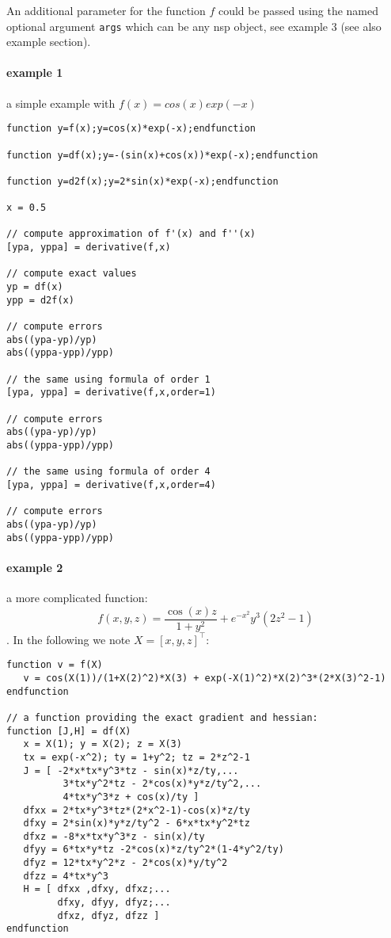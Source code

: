 \begin{mandescription}
An additional parameter for the function $f$ could be passed using the
named optional argument \verb+args+ which can be any nsp object, see
example 3 (see also  example section).

\end{mandescription}

\begin{examples}
  
\paragraph{example 1} a simple example with $f(x)=cos(x)exp(-x)$
\begin{Verbatim}
function y=f(x);y=cos(x)*exp(-x);endfunction

function y=df(x);y=-(sin(x)+cos(x))*exp(-x);endfunction

function y=d2f(x);y=2*sin(x)*exp(-x);endfunction

x = 0.5 

// compute approximation of f'(x) and f''(x) 
[ypa, yppa] = derivative(f,x) 

// compute exact values 
yp = df(x) 
ypp = d2f(x) 

// compute errors 
abs((ypa-yp)/yp) 
abs((yppa-ypp)/ypp) 

// the same using formula of order 1 
[ypa, yppa] = derivative(f,x,order=1) 

// compute errors 
abs((ypa-yp)/yp) 
abs((yppa-ypp)/ypp) 

// the same using formula of order 4 
[ypa, yppa] = derivative(f,x,order=4) 

// compute errors 
abs((ypa-yp)/yp) 
abs((yppa-ypp)/ypp)
\end{Verbatim}

\paragraph{example 2} a more complicated function:
$$f(x,y,z) = \frac{\cos(x) z}{1+y^2} + e^{-x^2} y^3 (2z^2-1)$$.
In the following we note $X = [x,y,z]^{\top}$:
\begin{Verbatim}
function v = f(X)
   v = cos(X(1))/(1+X(2)^2)*X(3) + exp(-X(1)^2)*X(2)^3*(2*X(3)^2-1)
endfunction

// a function providing the exact gradient and hessian: 
function [J,H] = df(X)
   x = X(1); y = X(2); z = X(3)
   tx = exp(-x^2); ty = 1+y^2; tz = 2*z^2-1
   J = [ -2*x*tx*y^3*tz - sin(x)*z/ty,...
          3*tx*y^2*tz - 2*cos(x)*y*z/ty^2,...
          4*tx*y^3*z + cos(x)/ty ]
   dfxx = 2*tx*y^3*tz*(2*x^2-1)-cos(x)*z/ty
   dfxy = 2*sin(x)*y*z/ty^2 - 6*x*tx*y^2*tz
   dfxz = -8*x*tx*y^3*z - sin(x)/ty
   dfyy = 6*tx*y*tz -2*cos(x)*z/ty^2*(1-4*y^2/ty)
   dfyz = 12*tx*y^2*z - 2*cos(x)*y/ty^2
   dfzz = 4*tx*y^3
   H = [ dfxx ,dfxy, dfxz;...
         dfxy, dfyy, dfyz;...
         dfxz, dfyz, dfzz ]
endfunction


\end{Verbatim}
\end{examples}
